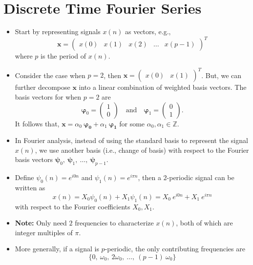 \section{Discrete Time Fourier Series}
\begin{itemize}
	\item Start by representing signals $x(n)$ as vectors, e.g.,
	      \[
		      \bm{x} =
		      \begin{pmatrix}
			      x(0) & x(1) & x(2) & \ldots & x(p-1)
		      \end{pmatrix}^T
	      \]
	      where $p$ is the period of $x(n)$.
	\item Consider the case when $p=2$, then $\bm{x} =
		      \begin{pmatrix}
			      x(0) & x(1)
		      \end{pmatrix}^T$.
	      But, we can further decompose $\bm{x}$ into a linear combination
	      of weighted basis vectors. The basis vectors for when $p=2$ are
	      \[
		      \bm{\varphi}_{0} =
		      \begin{pmatrix}
			      1 \\
			      0
		      \end{pmatrix}
		      \quad \text{and} \quad
		      \bm{\varphi}_1 =
		      \begin{pmatrix}
			      0 \\
			      1
		      \end{pmatrix}
		      .\]
	      It follows that, $\bm{x} = \alpha_0\ \bm{\varphi_0} + \alpha_1\ \bm{\varphi_1}$
	      for some $\alpha_0, \alpha_1 \in \mathbb{Z}$.
	\item In Fourier analysis, instead of using the standard basis to represent
	      the signal $x(n)$, we use another basis (i.e., change of basis)
	      with respect to the Fourier basis vectors
	      $\bm{\psi}_0,\ \bm{\psi}_1,\ \ldots,\ \bm{\psi}_{p-1}$.
	\item Define $\psi_0(n) = e^{i0n}$ and $\psi_1(n) = e^{i\pi n}$, then
	      a $2$-periodic signal can be written as
	      \[
		      x(n) = X_0 \psi_0(n) + X_1 \psi_1(n) = X_0\ e^{i0n} + X_1\ e^{i\pi n}
	      \]
	      with respect to the Fourier coefficients $X_0, X_1$.
	\item \textbf{Note:} Only need $2$ frequencies to characterize $x(n)$,
	      both of which are integer multiples of $\pi$.
	\item More generally, if a signal is $p$-periodic, the only contributing
	      frequencies are
	      \[
		      \{0,\ \omega_0,\ 2\omega_0,\ \ldots,\ (p-1)\ \omega_0\}
\]
\end{itemize}
